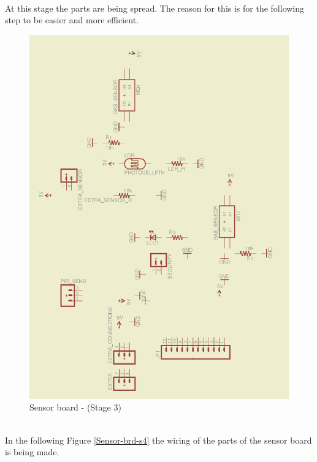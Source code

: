 \documentclass[12pt,a4paper,draft]{report}
\begin{document}
\ \\
At this stage the parts are being spread. The reason for this is for the following step to be easier and more efficient.
\ \\
\begin{figure}[H]
\centering
\includegraphics*[scale=0.25]{sens_brd_s3}
\caption{Sensor board -  (Stage 3)}
\label{Sensor-brd-s3}
\end{figure}
\ \\
In the following Figure \ref{Sensor-brd-s4} the wiring of the parts of the sensor board is being made.
\ \\
\end{document}
